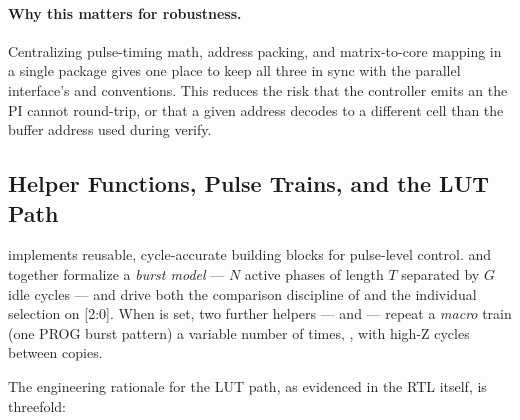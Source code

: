 \paragraph{Why this matters for robustness.}
Centralizing pulse-timing math, address packing, and matrix-to-core
mapping in a single package gives one place to keep all three in sync
with the parallel interface's  and
 conventions. This reduces the risk
that the controller emits an  the PI cannot
round-trip, or that a given address decodes to a different cell than
the buffer address used during verify.

\subsection{Helper Functions, Pulse Trains, and the LUT Path}
\label{sec:analysis-helpers}

 implements reusable, cycle-accurate building
blocks for pulse-level control.  and
 together formalize a
\emph{burst model} --- \(N\) active phases of length \(T\) separated by
\(G\) idle cycles --- and drive both the 
comparison discipline of  and the individual
 selection on [2:0]. When
 is set, two further helpers ---
 and
 --- repeat a \emph{macro} train
(one PROG burst pattern) a variable number of times, , with
 high-Z cycles between copies.

The engineering rationale for the LUT path, as evidenced in the RTL
itself, is threefold:

